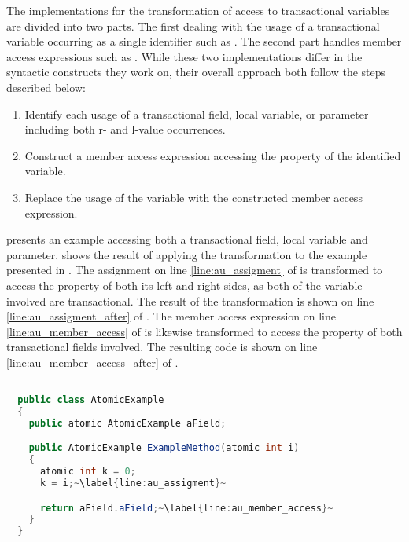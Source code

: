 The implementations for the transformation of access to transactional variables are divided into two parts. The first dealing with the usage of a transactional variable occurring as a single identifier such as . The second part handles member access expressions such as . While these two implementations differ in the syntactic constructs they work on, their overall approach both follow the steps described below:

\begin{enumerate}
	\item Identify each usage of a transactional field, local variable, or parameter including both r- and l-value occurrences.
	\item Construct a member access expression accessing the  property of the identified variable.
	\item Replace the usage of the variable with the constructed member access expression. 
\end{enumerate}

 presents an example accessing both a transactional field, local variable and parameter.  shows the result of applying the transformation to the example presented in . The assignment on line \ref{line:au_assigment} of  is transformed to access the  property of both its left and right sides, as both of the variable involved are transactional. The result of the transformation is shown on line \ref{line:au_assigment_after} of . The member access expression on line \ref{line:au_member_access} of  is likewise transformed to access the  property of both transactional fields involved. The resulting code is shown on line \ref{line:au_member_access_after} of .

\begin{lstlisting}[label=lst:before_atomic_usage,
  caption={Usage of \bscode{atomic} Variables Before Transformation},
  language=Java,  
  showspaces=false,
  showtabs=false,
  breaklines=true,
  showstringspaces=false,
  breakatwhitespace=true,
  escapechar=~,
  commentstyle=\color{greencomments},
  keywordstyle=\color{bluekeywords},
  stringstyle=\color{redstrings},
  morekeywords={atomic, retry, orelse, var, get, set}]  % Start your code-block

  public class AtomicExample
  {
    public atomic AtomicExample aField;

    public AtomicExample ExampleMethod(atomic int i)
    {
      atomic int k = 0;
      k = i;~\label{line:au_assigment}~

      return aField.aField;~\label{line:au_member_access}~
    }
  }
\end{lstlisting}

